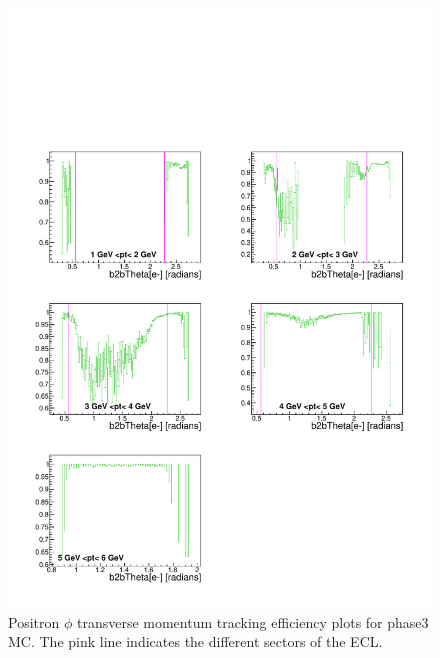 \documentclass[a4paper,11pt,twosided,final,german,openbib,pdftex,listof=totoc,bibliography=totoc]{scrbook}
\begin{document}
\begin{appendix}
\begin{figure}[!htbp]
	\centering
	\includegraphics[width=\textwidth]{Plots/master3/xPtMThetaep_MCP3}
	\caption[Transverse Momentum $\theta$ Positron Efficiency Phase3 MC]{Positron $\phi$ transverse momentum tracking efficiency plots for phase3 MC. The pink line indicates the different sectors of the ECL.}
	\label{plt:PtMThetaep3_MC}
\end{figure}



\end{appendix}
\end{document}

